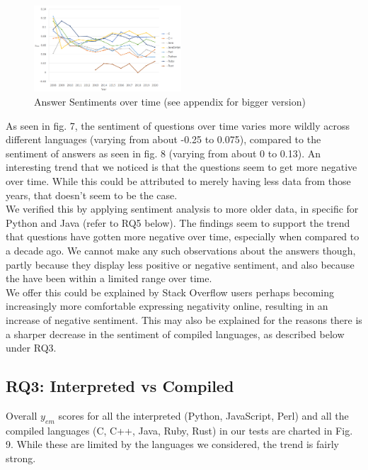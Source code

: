 \documentclass[conference]{IEEEtran}
\begin{document}
\begin{figure}[htbp]
\centerline{\includegraphics[width=0.49\textwidth]{figures/time_answers_em.png}}
\caption{Answer Sentiments over time (see appendix for bigger version)}
\label{fig}
\end{figure}

As seen in fig. 7, the sentiment of questions over time varies more wildly across different languages (varying from about -0.25 to 0.075), compared to the sentiment of answers as seen in fig. 8 (varying from about 0 to 0.13). An interesting trend that we noticed is that the questions seem to get more negative over time. While this could be attributed to merely having less data from those years, that doesn't seem to be the case.\\

We verified this by applying sentiment analysis to more older data, in specific for Python and Java (refer to RQ5 below). The findings seem to support the trend that questions have gotten more negative over time, especially when compared to a decade ago. We cannot make any such observations about the answers though, partly because they display less positive or negative sentiment, and also because the have been within a limited range over time.\\

We offer this could be explained by Stack Overflow users perhaps becoming increasingly more comfortable expressing negativity online, resulting in an increase of negative sentiment. This may also be explained for the reasons there is a sharper decrease in the sentiment of compiled languages, as described below under RQ3.\\


\subsection{RQ3: Interpreted vs Compiled}
Overall $y_{em}$ scores for all the interpreted (Python, JavaScript, Perl) and all the compiled languages (C, C++, Java, Ruby, Rust) in our tests are charted in Fig. 9. While these are limited by the languages we considered, the trend is fairly strong. \\
\end{document}
